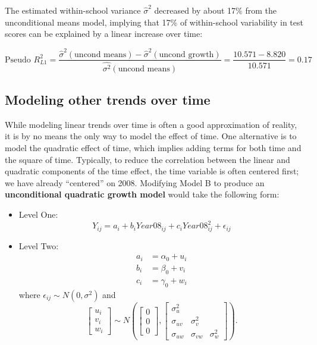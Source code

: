 \documentclass[
]{krantz}
\begin{document}
The estimated within-school variance \(\hat{\sigma}^2\) decreased by about 17\% from the unconditional means model, implying that 17\% of within-school variability in test scores can be explained by a linear increase over time:

\begin{equation}
\textrm{Pseudo }R^2_{L1} = \frac{\hat{\sigma}^2(\textrm{uncond means}) - \hat{\sigma}^2(\textrm{uncond growth})}{\hat{\sigma^2}(\textrm{uncond means})} = \frac{10.571-8.820}{10.571}= 0.17
\end{equation}

\hypertarget{othertimetrends}{%
\subsection{Modeling other trends over time}\label{othertimetrends}}

While modeling linear trends over time is often a good approximation of reality, it is by no means the only way to model the effect of time. One alternative is to model the quadratic effect of time, which implies adding terms for both time and the square of time. Typically, to reduce the correlation between the linear and quadratic components of the time effect, the time variable is often centered first; we have already ``centered'' on 2008. Modifying Model B to produce an \textbf{unconditional quadratic growth model} would take the following form:

\begin{itemize}
\item
  Level One:
  \begin{equation}
  Y_{ij}=a_{i}+b_{i}Year08_{ij}+c_{i}Year08^{2}_{ij} + \epsilon_{ij}
  \end{equation}
\item
  Level Two:
  \begin{align*}
  a_{i} & = \alpha_{0} + u_{i}\\
  b_{i} & = \beta_{0} + v_{i}\\
  c_{i} & = \gamma_{0} + w_{i}
  \end{align*}
  where \(\epsilon_{ij}\sim N(0,\sigma^2)\) and
  \[ \left[ \begin{array}{c}
            u_{i} \\ v_{i} \\ w_{i}
          \end{array}  \right] \sim N \left( \left[
          \begin{array}{c}
            0 \\ 0 \\ 0
          \end{array} \right], \left[
          \begin{array}{ccc}
            \sigma_{u}^{2} & & \\
            \sigma_{uv} & \sigma_{v}^{2} & \\
            \sigma_{uw} & \sigma_{vw} & \sigma_{w}^{2}
          \end{array} \right] \right) . \]
\end{itemize}
\end{document}
